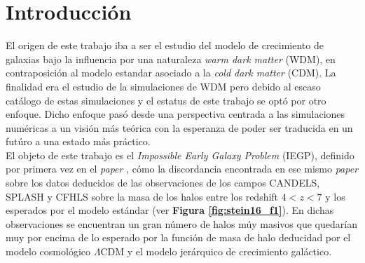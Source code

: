 
\chapter{Introducción} %

\label{introduction} %


\newcommand{\keyword}[1]{\textbf{#1}}
\newcommand{\tabhead}[1]{\textbf{#1}}
\newcommand{\code}[1]{\texttt{#1}}
\newcommand{\file}[1]{\texttt{\bfseries#1}}
\newcommand{\option}[1]{\texttt{\itshape#1}}
\newcommand{\lcdm}{$\Lambda$CDM }



El origen de este trabajo iba a ser el estudio del modelo de crecimiento de galaxias bajo la influencia por una naturaleza \textit{warm dark matter} (WDM), en contraposición al modelo estandar asociado a la \textit{cold dark matter} (CDM). La finalidad era el estudio de la simulaciones de WDM pero debido al escaso cat\'alogo de estas simulaciones y el estatus de este trabajo se opt\'o por otro enfoque. Dicho enfoque pas\'o desde una perspectiva centrada a las simulaciones num\'ericas a un visi\'on m\'as te\'orica con la esperanza de poder ser traducida en un fut\'uro a una estado m\'as pr\'actico.\\

El objeto de este trabajo es el \textit{Impossible Early Galaxy Problem} (IEGP), definido por primera vez en el \textit{paper} \cite{steinhardt2016impossibly}, c\'omo la discordancia encontrada en ese mismo \textit{paper} sobre los datos deducidos de las observaciones de los campos CANDELS, SPLASH y CFHLS sobre la masa de los halos entre los redshift $4<z<7$ y los esperados por el modelo est\'andar (ver \textbf{Figura \ref{fig:stein16_f1}}). En dichas observaciones se encuentran un gran n\'umero de halos m\'uy masivos que quedar\'ian muy por encima de lo esperado por la función de masa de halo deducidad por el modelo cosmol\'ogico \lcdm y el modelo jer\'arquico de crecimiento gal\'actico. 

